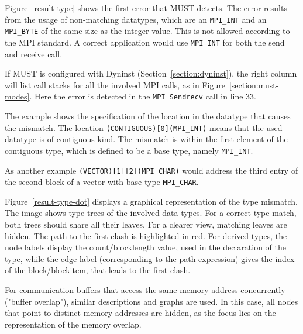 \documentclass[english]{scrartcl}
\begin{document}
Figure~\ref{result-type} shows the first error that MUST detects. The error
results from the usage of non-matching datatypes, which are an \texttt{MPI\_INT}
and an \texttt{MPI\_BYTE} of the same size as the integer value. This is not
allowed according to the MPI standard. A correct application would use
\texttt{MPI\_INT} for both the send and receive call.

If MUST is configured with Dyninst (Section~\ref{section:dyninst}), the right column will list call stacks for all the involved MPI calls, as in
Figure~\ref{section:must-modes}. 
Here the 
error is detected in the \texttt{MPI\_Sendrecv} call in line 33.

The example shows the specification of the location in the datatype that causes
the mismatch. 
The location \texttt{(CONTIGUOUS)[0](MPI\_INT)} means that the used
datatype is of contiguous kind. The mismatch is within the first element of the
contiguous type, which is defined to be a base type, namely \texttt{MPI\_INT}.

As another example \texttt{(VECTOR)[1][2](MPI\_CHAR)} would address the third
entry of the second block of a vector with base-type \texttt{MPI\_CHAR}.

Figure~\ref{result-type-dot} displays a graphical representation of the type
mismatch. The image shows type trees of the involved data types. For a correct type match,
both trees should share all their leaves. For a clearer view, matching leaves
are hidden. The path to the first clash is highlighted in red.
For derived types, the node labels display the count/blocklength value, 
used in the 
declaration of the type, while the edge label (corresponding to the path expression) 
gives the index of the block/blockitem, that leads to the first clash. 

For communication buffers that access the same memory address concurrently
("buffer overlap"), similar descriptions and graphs are used. In this case, all nodes that point to distinct memory addresses are hidden, as the focus lies on the
representation of the memory overlap.
\end{document}
